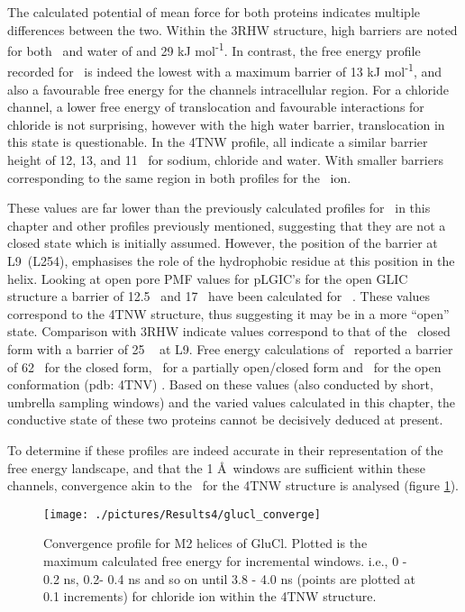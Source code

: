 The calculated potential of mean force for both proteins indicates multiple differences between the two. Within the 3RHW structure, high barriers are noted for both \Na\ and water of  and 29 kJ mol\textsuperscript{-1}. In contrast, the free energy profile recorded for \Cl\ is indeed the lowest with a maximum barrier of 13 kJ mol\textsuperscript{-1}, and also a favourable free energy for the channels intracellular region. For a chloride channel, a lower free energy of translocation and favourable interactions for chloride is not surprising, however with the high water barrier, translocation in this state is questionable. In the 4TNW profile, all indicate a similar barrier height of 12, 13, and 11 \kj\ for sodium, chloride and water. With smaller barriers corresponding to the same region in both profiles for the \Cl\ ion. 

These values are far lower than the previously calculated profiles for \HT\ in this chapter and other profiles previously mentioned, suggesting that they are not a closed state which is initially assumed.  However, the position of the barrier at L9\textquotesingle\ (L254), emphasises the role of the hydrophobic residue at this position in the helix. Looking at open pore PMF values for pLGIC's for the open GLIC structure \cite{Cheng2010} a barrier of 12.5 \kj\ and 17  \kj\ have been calculated for \Na\ \cite{Cheng2010,Zhu2012a}. These values correspond to the 4TNW structure, thus suggesting it may be in a more ``open'' state. Comparison with 3RHW indicate values correspond to that of the \na\ closed form with a barrier of 25 \kj\ \cite{Beckstein2006b} at L9\textquotesingle. Free energy calculations of \gl\ reported a barrier of 62 \kj\ for the closed form,  \kj\ for a partially open/closed form and  \kj\ for the open conformation (pdb: 4TNV) \cite{Yoluk2015}. Based on these values (also conducted by short, umbrella sampling windows) and the varied values calculated in this chapter, the conductive state of these two proteins cannot be decisively deduced at present. 

To determine if these profiles are indeed accurate in their representation of the free energy landscape, and that the 1 \AA\ windows are sufficient within these channels, convergence akin to the \HT\ for the 4TNW structure is analysed (figure \ref{fig:glucl_converge}). 


\begin{figure}[H]
\begin{center}
\texttt{[image: ./pictures/Results4/glucl\_converge]}
\caption[Convergence profile for M2 helices of GluCl.] {Convergence profile for M2 helices of GluCl. Plotted is the maximum calculated free energy for incremental windows. i.e., 0 - 0.2 ns, 0.2- 0.4 ns and so on until 3.8 - 4.0 ns (points are plotted at 0.1 increments) for chloride ion within the 4TNW structure.}
\label{fig:glucl_converge}
\end{center}
\end{figure}

